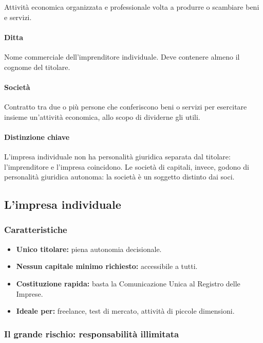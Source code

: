 \documentclass[a4paper,12pt]{article}
\begin{document}
	Attività economica organizzata e professionale volta a produrre o scambiare beni e servizi.
	
	\paragraph{Ditta}
	
	Nome commerciale dell'imprenditore individuale.%
	Deve contenere almeno il cognome del titolare.
	
	\paragraph{Società}
	
	Contratto tra due o più persone che conferiscono beni o servizi per esercitare insieme un'attività economica, allo scopo di dividerne gli utili.
	
	\paragraph{Distinzione chiave}
	
	L'impresa individuale non ha personalità giuridica separata dal titolare: l'imprenditore e l'impresa coincidono.%
	Le società di capitali, invece, godono di personalità giuridica autonoma: la società è un soggetto distinto dai soci.
	
	\subsection{L'impresa individuale}
	
	\subsubsection{Caratteristiche}
	
	\begin{itemize}
		\item \textbf{Unico titolare:} piena autonomia decisionale.
		\item \textbf{Nessun capitale minimo richiesto:} accessibile a tutti.
		\item \textbf{Costituzione rapida:} basta la Comunicazione Unica al Registro delle Imprese.
		\item \textbf{Ideale per:} freelance, test di mercato, attività di piccole dimensioni.
	\end{itemize}
	
	\subsubsection{Il grande rischio: responsabilità illimitata}
	
\end{document}
